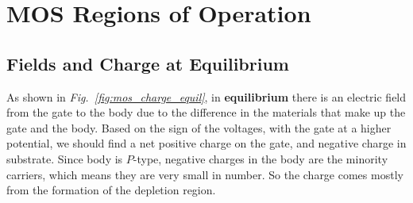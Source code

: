 \section{MOS Regions of Operation}
\subsection{Fields and Charge at Equilibrium}
As shown in \emph{Fig.~\ref{fig:mos_charge_equil}}, in \textbf{equilibrium} there is an electric field from the gate to the body due to the difference in the materials that make up the gate and the body.  Based on the sign of the voltages, with the gate at a higher potential, we should find a net positive charge on the gate, and negative charge in substrate.  Since body is $P$-type, negative charges in the body are the minority carriers, which means they are very small in number.  So the charge comes mostly from the formation of the depletion region.
